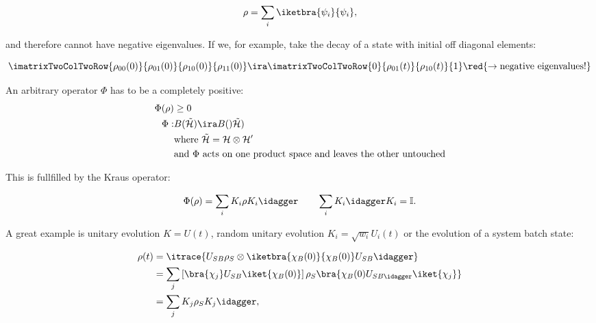   \begin{equation}\label{eq:linrelax_1}
    \rho = \sum_i\iketbra{\psi_i}{\psi_i},
  \end{equation}

  \noindent and therefore cannot have negative eigenvalues.  If we, for
  example,  take  the  decay  of  a state  with  initial  off  diagonal
  elements:

  \begin{equation}\label{eq:linrelax_2}
    \imatrixTwoColTwoRow{\rho_{00}(0)}{\rho_{01}(0)}{\rho_{10}(0)}{\rho_{11}(0)} \ira \imatrixTwoColTwoRow{0}{\rho_{01}(t)}{\rho_{10}(t)}{1} \red{\rightarrow \text{negative eigenvalues!}}
  \end{equation}

\begin{framed}\noindent
  An arbitrary operator $ \Phi $ has to be a completely positive:
  \begin{equation}\label{eq:linrelax_3}
    \begin{aligned}
      \Phi(\rho) & \ge 0\\
      \Phi : & B(\mathcal{\tilde{H}}) \ira B()\mathcal{\tilde{H}})\\
      & \text{where } \mathcal{\tilde{H}} = \mathcal{{H}} \otimes \mathcal{H'}\\
      & \text{and }  \Phi \text{ acts on one product  space and leaves the
        other untouched}
    \end{aligned}
  \end{equation}

\end{framed}

\noindent This is fullfilled by the Kraus operator:

  \begin{equation}\label{eq:linrelax_4}
    \Phi(\rho) = \sum_iK_i\rho K_i\idagger\qquad \sum_iK_i\idagger K_i = \mathbb{I}.
  \end{equation}

  \noindent A great  example is unitary evolution $ K  = U(t) $, random
  unitary evolution  $ K_i = \sqrt{w_i}U_i(t)  $ or the evolution  of a
  system batch state:

  \begin{equation}
    \begin{aligned}
      \rho(t) & = \itrace{U_{SB} \rho_S\otimes\iketbra{\chi_B(0)}{\chi_B(0)}U_{SB}\idagger}\\
      & = \sum_j\left[\bra{\chi_j}U_{SB}\iket{\chi_B(0)}\right]\rho_{S}\bra{\chi_{B}(0)U_{SB\idagger}\iket{\chi_j}}\\
      & = \sum_j K_j\rho_{S}K_j\idagger,
    \end{aligned}
  \end{equation}

